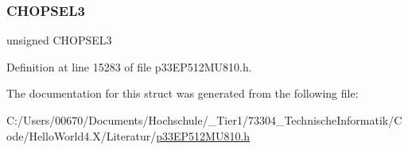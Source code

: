 \subsubsection{\texorpdfstring{C\+H\+O\+P\+S\+E\+L3}{CHOPSEL3}}
{\footnotesize\ttfamily unsigned C\+H\+O\+P\+S\+E\+L3}



Definition at line 15283 of file p33\+E\+P512\+M\+U810.\+h.



The documentation for this struct was generated from the following file\+:\begin{DoxyCompactItemize}
\item 
C\+:/\+Users/00670/\+Documents/\+Hochschule/\+\_\+\+Tier1/73304\+\_\+\+Technische\+Informatik/\+Code/\+Hello\+World4.\+X/\+Literatur/\hyperlink{p33_e_p512_m_u810_8h}{p33\+E\+P512\+M\+U810.\+h}\end{DoxyCompactItemize}
